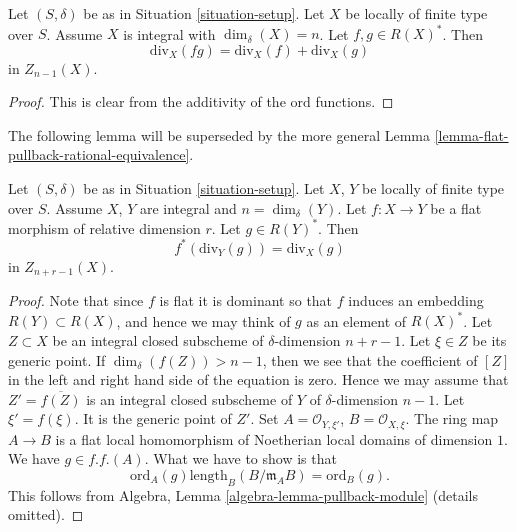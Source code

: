 \begin{lemma}
\label{lemma-div-additive}
Let $(S, \delta)$ be as in Situation \ref{situation-setup}.
Let $X$ be locally of finite type over $S$. Assume $X$ is
integral with $\dim_\delta(X) = n$.
Let $f, g \in R(X)^*$.
Then
$$
\text{div}_X(fg) = \text{div}_X(f) + \text{div}_X(g)
$$
in $Z_{n - 1}(X)$.
\end{lemma}

\begin{proof}
This is clear from the additivity of the $\text{ord}$ functions.
\end{proof}

\noindent
The following lemma will be superseded by the more general
Lemma \ref{lemma-flat-pullback-rational-equivalence}.

\begin{lemma}
\label{lemma-flat-pullback-principal-divisor}
Let $(S, \delta)$ be as in Situation \ref{situation-setup}.
Let $X$, $Y$ be locally of finite type over $S$. Assume $X$, $Y$
are integral and $n = \dim_\delta(Y)$.
Let $f : X \to Y$ be a flat morphism of relative dimension $r$.
Let $g \in R(Y)^*$. Then
$$
f^*(\text{div}_Y(g)) = \text{div}_X(g)
$$
in $Z_{n + r - 1}(X)$.
\end{lemma}

\begin{proof}
Note that since $f$ is flat it is dominant so that
$f$ induces an embedding $R(Y) \subset R(X)$, and hence
we may think of $g$ as an element of $R(X)^*$.
Let $Z \subset X$ be an integral closed subscheme of
$\delta$-dimension $n + r - 1$. Let $\xi \in Z$
be its generic point. If $\dim_\delta(f(Z)) > n - 1$,
then we see that the coefficient of $[Z]$ in the left and
right hand side of the equation is zero.
Hence we may assume that $Z' = \overline{f(Z)}$ is an
integral closed subscheme of $Y$ of $\delta$-dimension $n - 1$.
Let $\xi' = f(\xi)$. It is the generic point of $Z'$.
Set $A = \mathcal{O}_{Y, \xi'}$, $B = \mathcal{O}_{X, \xi}$.
The ring map $A \to B$ is a flat local homomorphism of
Noetherian local domains of dimension $1$.
We have $g \in f.f.(A)$. What we have to show is that
$$
\text{ord}_A(g) \text{length}_B(B/\mathfrak m_AB)
=
\text{ord}_B(g).
$$
This follows from Algebra, Lemma \ref{algebra-lemma-pullback-module}
(details omitted).
\end{proof}











